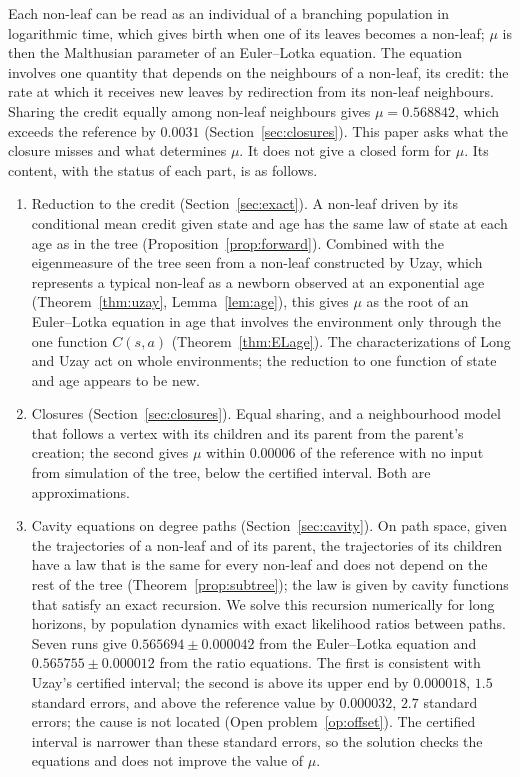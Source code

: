 \documentclass[11pt]{article}
\theoremstyle{plain}
\theoremstyle{definition}
\theoremstyle{remark}
\begin{document}
Each non-leaf can be read as an individual of a branching population in logarithmic time, which gives birth when one of its leaves becomes a non-leaf; $\mu$ is then the Malthusian parameter of an Euler--Lotka equation. The equation involves one quantity that depends on the neighbours of a non-leaf, its credit: the rate at which it receives new leaves by redirection from its non-leaf neighbours. Sharing the credit equally among non-leaf neighbours gives $\mu=0.568842$, which exceeds the reference by $0.0031$ (Section~\ref{sec:closures}). This paper asks what the closure misses and what determines $\mu$. It does not give a closed form for $\mu$. Its content, with the status of each part, is as follows.
\begin{enumerate}
\item Reduction to the credit (Section~\ref{sec:exact}). A non-leaf driven by its conditional mean credit given state and age has the same law of state at each age as in the tree (Proposition~\ref{prop:forward}). Combined with the eigenmeasure of the tree seen from a non-leaf constructed by Uzay, which represents a typical non-leaf as a newborn observed at an exponential age (Theorem~\ref{thm:uzay}, Lemma~\ref{lem:age}), this gives $\mu$ as the root of an Euler--Lotka equation in age that involves the environment only through the one function $C(s,a)$ (Theorem~\ref{thm:ELage}). The characterizations of Long and Uzay act on whole environments; the reduction to one function of state and age appears to be new.
\item Closures (Section~\ref{sec:closures}). Equal sharing, and a neighbourhood model that follows a vertex with its children and its parent from the parent's creation; the second gives $\mu$ within $0.00006$ of the reference with no input from simulation of the tree, below the certified interval. Both are approximations.
\item Cavity equations on degree paths (Section~\ref{sec:cavity}). On path space, given the trajectories of a non-leaf and of its parent, the trajectories of its children have a law that is the same for every non-leaf and does not depend on the rest of the tree (Theorem~\ref{prop:subtree}); the law is given by cavity functions that satisfy an exact recursion. We solve this recursion numerically for long horizons, by population dynamics with exact likelihood ratios between paths. Seven runs give $0.565694\pm0.000042$ from the Euler--Lotka equation and $0.565755\pm0.000012$ from the ratio equations. The first is consistent with Uzay's certified interval; the second is above its upper end by $0.000018$, $1.5$ standard errors, and above the reference value by $0.000032$, $2.7$ standard errors; the cause is not located (Open problem~\ref{op:offset}). The certified interval is narrower than these standard errors, so the solution checks the equations and does not improve the value of $\mu$.

\end{enumerate}
\end{document}
